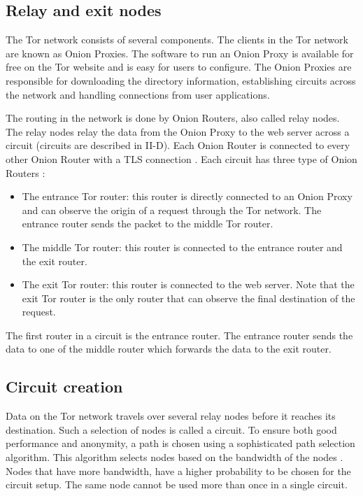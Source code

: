 \documentclass{article}
\begin{document}
	\subsection{Relay and exit nodes}
		The Tor network consists of several components. The clients in the Tor network are known as Onion Proxies. The software to run an Onion Proxy is available for free on the Tor website \cite{torprojectwebsite} and is easy for users to configure. The Onion Proxies are responsible for downloading the directory information, establishing circuits across the network and handling connections from user applications.
		
		The routing in the network is done by Onion Routers, also called relay nodes. The relay nodes relay the data from the Onion Proxy to the web server across a circuit (circuits are described in II-D). Each Onion Router is connected to every other Onion Router with a TLS connection \cite{tlsprotocol}. Each circuit has three type of Onion Routers \cite{mccoy2008shining}:
		
		\begin{itemize}
			\item{The entrance Tor router:} this router is directly connected to an Onion Proxy and can observe the origin of a request through the Tor network. The entrance router sends the packet to the middle Tor router.
			\item{The middle Tor router:} this router is connected to the entrance router and the exit router.
			\item{The exit Tor router:} this router is connected to the web server. Note that the exit Tor router is the only router that can observe the final destination of the request.
		\end{itemize}
		
		The first router in a circuit is the entrance router. The entrance router sends the data to one of the middle router which forwards the data to the exit router.
			
	\subsection{Circuit creation}
		\label{ss:tor_circuit}
		
		Data on the Tor network travels over several relay nodes before it reaches its destination. Such a selection of nodes is called a circuit. To ensure both good performance and anonymity, a path is chosen using a sophisticated path selection algorithm. This algorithm selects nodes based on the bandwidth of the nodes \cite{wang2012congestion}. Nodes that have more bandwidth, have a higher probability to be chosen for the circuit setup. The same node cannot be used more than once in a single circuit.
		
\end{document}
